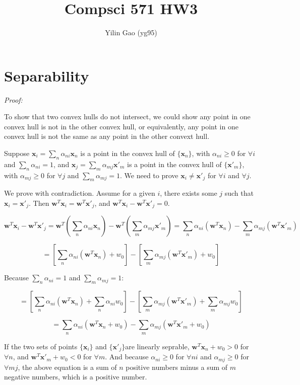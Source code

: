 \documentclass[paper=letter, fontsize=12pt]{article}
\title{Compsci 571 HW3}
\author{Yilin Gao (yg95)}
\begin{document}
\maketitle
\section{Separability}

\textit{Proof:}

To show that two convex hulls do not intersect, we could show any point in one convex hull is not in the other convex hull, or equivalently, any point in one convex hull is not the same as any point in the other convext hull.

Suppose $\mathbf{x}_i = \sum_{n} \alpha_{ni} \mathbf{x}_{n}$ is a point in the convex hull of $\{\mathbf{x}_n\}$, with $\alpha_{ni} \geq 0$ for $\forall i$ and $\sum_{n} \alpha_{ni} = 1$, and $\mathbf{x}_j = \sum_{m} \alpha_{mj} \mathbf{x'}_{m}$ is a point in the convex hull of $\{\mathbf{x'}_m\}$, with $\alpha_{mj} \geq 0$ for $\forall j$ and $\sum_{m} \alpha_{mj} = 1$. We need to prove $\mathbf{x}_i \neq \mathbf{x'}_j$ for $\forall i$ and $\forall j$.

We prove with contradiction. Assume for a given $i$, there exists some $j$ such that $\mathbf{x}_i = \mathbf{x'}_j$. Then $\mathbf{w}^T \mathbf{x}_i= \mathbf{w}^T \mathbf{x'}_j$, and $\mathbf{w}^T \mathbf{x}_i - \mathbf{w}^T \mathbf{x'}_j = 0$.

$$\mathbf{w}^T \mathbf{x}_i - \mathbf{w}^T \mathbf{x'}_j = \mathbf{w}^T(\sum_{n} \alpha_{ni} \mathbf{x}_n) - \mathbf{w}^T(\sum_{m} \alpha_{mj} \mathbf{x'}_m) = \sum_{n} \alpha_{ni} (\mathbf{w}^T \mathbf{x}_n) - \sum_{m} \alpha_{mj} (\mathbf{w}^T \mathbf{x'}_m)$$

$$= [\sum_{n} \alpha_{ni} (\mathbf{w}^T \mathbf{x}_n) + w_0] - [\sum_{m} \alpha_{mj} (\mathbf{w}^T \mathbf{x'}_m) + w_0]$$

Because $\sum_{n} \alpha_{ni} = 1$ and $\sum_{m} \alpha_{mj} = 1$:

$$= [\sum_{n} \alpha_{ni} (\mathbf{w}^T \mathbf{x}_n) + \sum_{n} \alpha_{ni} w_0] - [\sum_{m} \alpha_{mj} (\mathbf{w}^T \mathbf{x'}_m) + \sum_{m} \alpha_{mj} w_0]$$

$$= \sum_{n} \alpha_{ni} (\mathbf{w}^T \mathbf{x}_n + w_0) - \sum_{m} \alpha_{mj} (\mathbf{w}^T \mathbf{x'}_m + w_0)$$

If the two sets of points $\{\mathbf{x}_i \}$ and $\{\mathbf{x'}_j \}$are linearly seprable, $\mathbf{w}^T \mathbf{x}_n + w_0 > 0$ for $\forall n$, and $\mathbf{w}^T \mathbf{x'}_m + w_0 < 0$ for $\forall m$. And because $\alpha_{ni} \geq 0$ for $\forall ni$ and $\alpha_{mj} \geq 0$ for $\forall mj$, the above equation is a sum of $n$ positive numbers minus a sum of $m$ negative numbers, which is a positive number.
\end{document}
